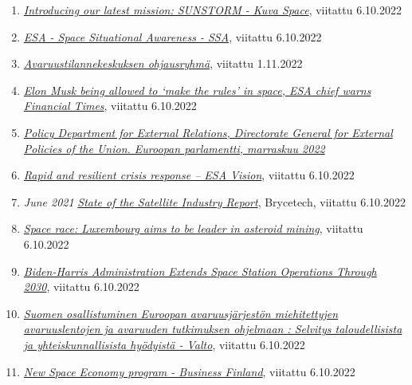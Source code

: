 \documentclass[nobib,finnish,oneside,openany,notoc,a4paper]{tufte-book}
\begin{document}
{\begin{enumerate}
\item
  \href{https://kuvaspace.com/2019/06/04/introducing-our-latest-mission-sunstorm/}{\emph{Introducing
  our latest mission: SUNSTORM - Kuva Space}}, viitattu 6.10.2022
\item
  \href{https://www.esa.int/About_Us/ESAC/Space_Situational_Awareness_-_SSA}{\emph{ESA
  - Space Situational Awareness - SSA}}, viitattu 6.10.2022
\item
  \href{https://valtioneuvosto.fi/hanke?tunnus=LVM035:00/2022}{\emph{Avaruustilannekeskuksen
  ohjausryhmä}}, viitattu 1.11.2022
\item
  \href{https://www.ft.com/content/7d561078-37c7-4902-a094-637b81a26241}{\emph{Elon
  Musk being allowed to `make the rules' in space, ESA chief warns
  \textbar{} Financial Times}}, viitattu 6.10.2022
\item
  \href{The Strategic Compass and  EU space-based defence capabilities}\emph{Policy
  Department for External Relations, Directorate General for External Policies of the
  Union. Euroopan parlamentti, marraskuu 2022}
\item
  \href{https://vision.esa.int/rapid-and-resilient-crisis-response/}{\emph{Rapid
  and resilient crisis response -- ESA Vision}}, viitattu 6.10.2022
\item
  \emph{June 2021
  }\href{https://brycetech.com/reports/report-documents/SIA_SSIR_2021.pdf}{\emph{State
  of the Satellite Industry Report}}, Brycetech, viitattu 6.10.2022
\item
  \href{https://miningglobal.com/supply-chain-and-operations/space-race-luxembourg-aims-be-leader-asteroid-mining}{\emph{Space
  race: Luxembourg aims to be leader in asteroid mining}}, viitattu
  6.10.2022
\item
  \href{https://blogs.nasa.gov/spacestation/2021/12/31/biden-harris-administration-extends-space-station-operations-through-2030/}{\emph{Biden-Harris
  Administration Extends Space Station Operations Through 2030}},
  viitattu 6.10.2022
\item
  \href{https://urn.fi/URN:ISBN:978-952-327-704-5}{\emph{Suomen
  osallistuminen Euroopan avaruusjärjestön miehitettyjen avaruuslentojen
  ja avaruuden tutkimuksen ohjelmaan : Selvitys taloudellisista ja
  yhteiskunnallisista hyödyistä - Valto}}, viitattu 6.10.2022
\item
  \href{https://www.businessfinland.fi/en/for-finnish-customers/services/programs/new-space-economy}{\emph{New
  Space Economy program - Business Finland}}, viitattu 6.10.2022
\end{enumerate}

}
\end{document}
